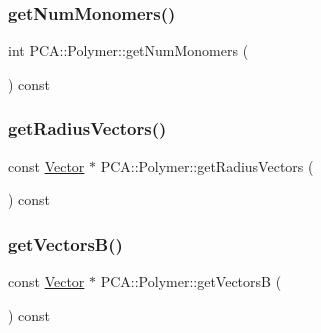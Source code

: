 \hypertarget{class_p_c_a_1_1_polymer_a5c87b083f77c06ffd14278f87dad47ea}{}\label{class_p_c_a_1_1_polymer_a5c87b083f77c06ffd14278f87dad47ea} 
\subsubsection{\texorpdfstring{get\+Num\+Monomers()}{getNumMonomers()}}
{\footnotesize\ttfamily int P\+C\+A\+::\+Polymer\+::get\+Num\+Monomers (\begin{DoxyParamCaption}{ }\end{DoxyParamCaption}) const\hspace{0.3cm}{\ttfamily [inline]}}

\hypertarget{class_p_c_a_1_1_polymer_a6e913f9b50a164c828f9a3cb89e452e1}{}\label{class_p_c_a_1_1_polymer_a6e913f9b50a164c828f9a3cb89e452e1} 
\subsubsection{\texorpdfstring{get\+Radius\+Vectors()}{getRadiusVectors()}}
{\footnotesize\ttfamily const \hyperlink{class_p_c_a_1_1_vector}{Vector} $\ast$ P\+C\+A\+::\+Polymer\+::get\+Radius\+Vectors (\begin{DoxyParamCaption}{ }\end{DoxyParamCaption}) const}

\hypertarget{class_p_c_a_1_1_polymer_a4a90f901ceb688b0d96b126cc2ba3678}{}\label{class_p_c_a_1_1_polymer_a4a90f901ceb688b0d96b126cc2ba3678} 
\subsubsection{\texorpdfstring{get\+Vectors\+B()}{getVectorsB()}}
{\footnotesize\ttfamily const \hyperlink{class_p_c_a_1_1_vector}{Vector} $\ast$ P\+C\+A\+::\+Polymer\+::get\+VectorsB (\begin{DoxyParamCaption}{ }\end{DoxyParamCaption}) const}

\hypertarget{class_p_c_a_1_1_polymer_a83c92fb07eafc88d121ef4b4124319c3}{}\label{class_p_c_a_1_1_polymer_a83c92fb07eafc88d121ef4b4124319c3} 
